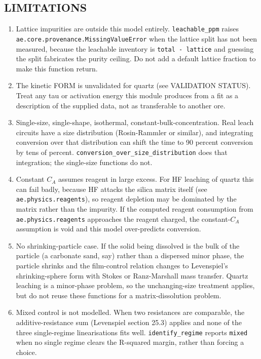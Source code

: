\documentclass[10pt,a4paper,twoside]{report}
\begin{document}
\subsection*{LIMITATIONS}

\begin{enumerate}[leftmargin=*,label=\arabic*.]
\item Lattice impurities are outside this model entirely. \texttt{leachable\_ppm} raises \texttt{ae.core.provenance.MissingValueError} when the lattice split has not been measured, because the leachable inventory is \texttt{total - lattice} and guessing the split fabricates the purity ceiling. Do not add a default lattice fraction to make this function return.
\item The kinetic FORM is unvalidated for quartz (see VALIDATION STATUS). Treat any tau or activation energy this module produces from a fit as a description of the supplied data, not as transferable to another ore.
\item Single-size, single-shape, isothermal, constant-bulk-concentration. Real leach circuits have a size distribution (Rosin-Rammler or similar), and integrating conversion over that distribution can shift the time to 90 percent conversion by tens of percent. \texttt{conversion\_over\_size\_distribution} does that integration; the single-size functions do not.
\item Constant $C_A$ assumes reagent in large excess. For HF leaching of quartz this can fail badly, because HF attacks the silica matrix itself (see \texttt{ae.physics.reagents}), so reagent depletion may be dominated by the matrix rather than the impurity. If the computed reagent consumption from \texttt{ae.physics.reagents} approaches the reagent charged, the constant-$C_A$ assumption is void and this model over-predicts conversion.
\item No shrinking-particle case. If the solid being dissolved is the bulk of the particle (a carbonate sand, say) rather than a dispersed minor phase, the particle shrinks and the film-control relation changes to Levenspiel's shrinking-sphere form with Stokes or Ranz-Marshall mass transfer. Quartz leaching is a minor-phase problem, so the unchanging-size treatment applies, but do not reuse these functions for a matrix-dissolution problem.
\item Mixed control is not modelled. When two resistances are comparable, the additive-resistance sum (Levenspiel section 25.3) applies and none of the three single-regime linearisations fits well. \texttt{identify\_regime} reports \texttt{mixed} when no single regime clears the R-squared margin, rather than forcing a choice.

\end{enumerate}
\end{document}
